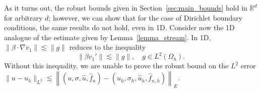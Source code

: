 \documentclass[11pt,onecolumn]{scrartcl}
\newcommand{\eqnref}[1]{\eqref{eq:#1}}
\newcommand{\nor}[1]{\left\| #1 \right\|}
\newcommand{\LRs}[1]{\left[ #1 \right]}
\newcommand{\LRa}[1]{\left\langle #1 \right\rangle}
\newcommand{\jump}[1] {\ensuremath{\LRs{\![#1]\!}}}
\newcommand{\Gh}{\Gamma_h}
\newcommand{\Oh}{\Omega_h}
\newcommand{\grad}{\nabla}
\renewcommand{\div}{\grad \cdot}
\begin{document}
As it turns out, the robust bounds given in Section~\ref{sec:main_bounds} hold in $\mathbb{R}^d$ for arbitrary $d$; however, we can show that for the case of Dirichlet boundary conditions, the same results do not hold, even in 1D.  
%
Consider now the 1D analogue of the estimate given by Lemma~\ref{lemma_stream}.  In 1D, $\|\beta\cdot\grad v_1\| \lesssim \|g\|$ reduces to the inequality 
\[
\|\beta v_1'\|\lesssim \|g\|, \quad g\in L^2\!\left(\Oh\right).
\]
Without this inequality, we are unable to prove the robust bound on the $L^2$ error $\|u-u_h\|_{L^2} \lesssim \nor{(u,\sigma,\widehat{u},\widehat{f}_n)-(u_h,\sigma_h,\widehat{u}_h,\widehat{f}_{n,h})}_E$.
\end{document}
